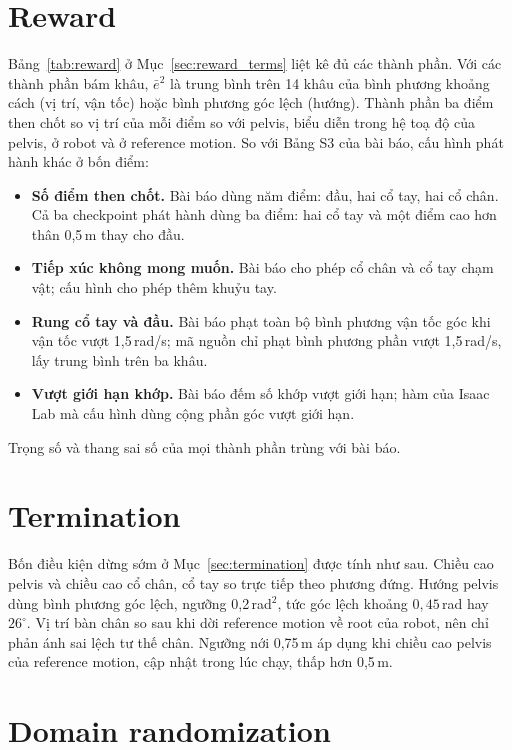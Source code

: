 \documentclass[12pt,a4paper,oneside]{report}
\begin{document}
\section{Reward}

Bảng~\ref{tab:reward} ở Mục~\ref{sec:reward_terms} liệt kê đủ các thành phần. Với các thành phần bám khâu, $\bar e^2$ là trung bình trên 14 khâu của bình phương khoảng cách (vị trí, vận tốc) hoặc bình phương góc lệch (hướng). Thành phần ba điểm then chốt so vị trí của mỗi điểm so với pelvis, biểu diễn trong hệ toạ độ của pelvis, ở robot và ở reference motion. So với Bảng S3 của bài báo, cấu hình phát hành khác ở bốn điểm:
\begin{itemize}
\item \textbf{Số điểm then chốt.} Bài báo dùng năm điểm: đầu, hai cổ tay, hai cổ chân. Cả ba checkpoint phát hành dùng ba điểm: hai cổ tay và một điểm cao hơn thân 0,5\,m thay cho đầu.
\item \textbf{Tiếp xúc không mong muốn.} Bài báo cho phép cổ chân và cổ tay chạm vật; cấu hình cho phép thêm khuỷu tay.
\item \textbf{Rung cổ tay và đầu.} Bài báo phạt toàn bộ bình phương vận tốc góc khi vận tốc vượt 1,5\,rad/s; mã nguồn chỉ phạt bình phương phần vượt 1,5\,rad/s, lấy trung bình trên ba khâu.
\item \textbf{Vượt giới hạn khớp.} Bài báo đếm số khớp vượt giới hạn; hàm của Isaac Lab mà cấu hình dùng cộng phần góc vượt giới hạn.
\end{itemize}
Trọng số và thang sai số của mọi thành phần trùng với bài báo.

\section{Termination}

Bốn điều kiện dừng sớm ở Mục~\ref{sec:termination} được tính như sau. Chiều cao pelvis và chiều cao cổ chân, cổ tay so trực tiếp theo phương đứng. Hướng pelvis dùng bình phương góc lệch, ngưỡng 0,2\,rad$^2$, tức góc lệch khoảng $0{,}45$\,rad hay $26^\circ$. Vị trí bàn chân so sau khi dời reference motion về root của robot, nên chỉ phản ánh sai lệch tư thế chân. Ngưỡng nới 0,75\,m áp dụng khi chiều cao pelvis của reference motion, cập nhật trong lúc chạy, thấp hơn 0,5\,m.

\section{Domain randomization}
\end{document}
